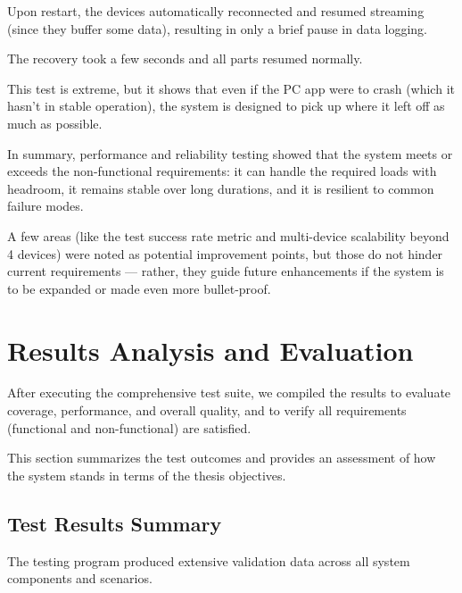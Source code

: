 {{{{{{{{{{{{Upon restart, the devices automatically reconnected and resumed streaming (since they buffer some data), resulting in only a brief pause in data logging.

The recovery took a few seconds and all parts resumed normally.

This test is extreme, but it shows that even if the PC app were to crash (which it hasn't in stable operation), the system is designed to pick up where it left off as much as possible.

In summary, performance and reliability testing showed that the system meets or exceeds the non-functional requirements: it can handle the required loads with headroom, it remains stable over long durations, and it is resilient to common failure modes.

A few areas (like the test success rate metric and multi-device scalability beyond 4 devices) were noted as potential improvement points, but those do not hinder current requirements --- rather, they guide future enhancements if the system is to be expanded or made even more bullet-proof.

\section{Results Analysis and Evaluation}

After executing the comprehensive test suite, we compiled the results to evaluate coverage, performance, and overall quality, and to verify all requirements (functional and non-functional) are satisfied.

This section summarizes the test outcomes and provides an assessment of how the system stands in terms of the thesis objectives.

\subsection{Test Results Summary}

The testing program produced extensive validation data across all system components and scenarios.

}}}}}}}}}}}}
